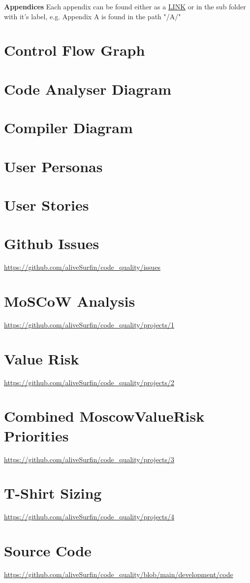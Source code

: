 
\huge{\textbf{Appendices}}
\newline
\normalsize{Each appendix can be found either as a \underline{LINK} or in the sub folder with it's label, e.g. Appendix A is found in the path "/A/"}
\section{Control Flow Graph}
\section{Code Analyser Diagram}
\section{Compiler Diagram}
\section{User Personas}
\section{User Stories}
\section{Github Issues}
\url{https://github.com/aliveSurfin/code_quality/issues}
\section{MoSCoW Analysis}
\url{https://github.com/aliveSurfin/code_quality/projects/1}
\section{Value Risk}
\url{https://github.com/aliveSurfin/code_quality/projects/2}
\section{Combined MoscowValueRisk Priorities}
\url{https://github.com/aliveSurfin/code_quality/projects/3}
\section{T-Shirt Sizing}
\url{https://github.com/aliveSurfin/code_quality/projects/4}
\section{Source Code}
\url{https://github.com/aliveSurfin/code_quality/blob/main/development/code}
